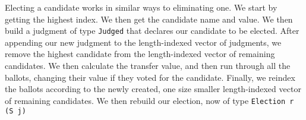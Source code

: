 Electing a candidate works in similar ways to eliminating one. We start by
getting the highest index. We then get the candidate name and value. We then
build a judgment of type \texttt{Judged} that declares our candidate to be
elected. After appending our new judgment to the length-indexed vector of
judgments, we remove the highest candidate from the length-indexed vector of
remaining candidates. We then calculate the transfer value, and then run through
all the ballots, changing their value if they voted for the candidate. Finally,
we reindex the ballots according to the newly created, one size smaller
length-indexed vector of remaining candidates. We then rebuild our election, now
of type \texttt{Election r (S j)}